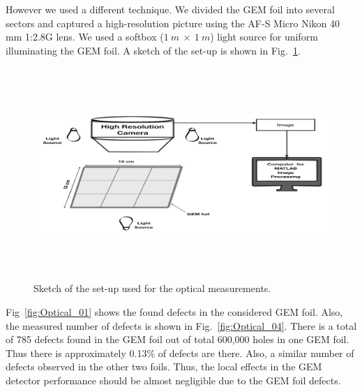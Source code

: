 However we used a different technique.
We divided the GEM foil into several sectors and captured a high-resolution picture using the AF-S Micro Nikon 40 mm 1:2.8G lens.
We used a softbox ($1~m~\times~1~m$) light source for uniform illuminating the GEM foil.
A sketch of the set-up is shown in Fig.~\ref{fig:Optical_Sketch}.
\begin{figure}[!htbp]
    \centering
        \includegraphics[width=12cm, height=8cm]{figures/GEM/figures/2.jpeg}
   \caption{Sketch of the set-up used for the optical measurements.}   \label{fig:Optical_Sketch}
\end{figure}
Fig~\ref{fig:Optical_01} shows the found defects in the considered GEM foil. Also, the measured number of defects is shown in Fig.~\ref{fig:Optical_04}. There is a total of 785 defects found in the GEM foil out of total 600,000 holes in one GEM foil.
Thus there is approximately 0.13\% of defects are there.
Also, a similar number of defects observed in the other two foils. Thus, the local effects in the GEM detector performance should be almost negligible due to the GEM foil defects.
